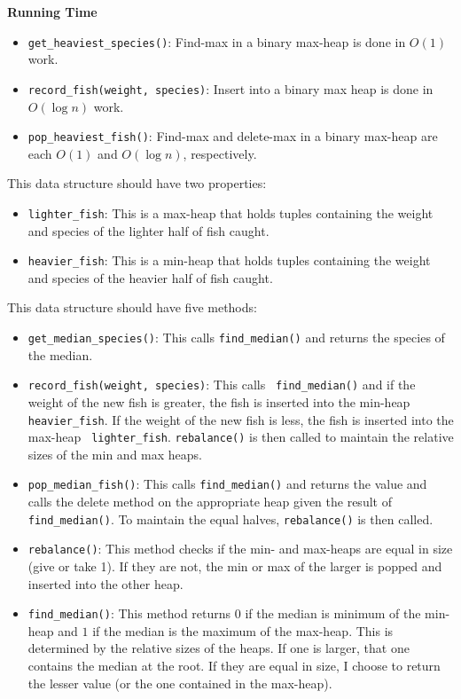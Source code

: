 \documentclass[12pt,twoside]{article}
\begin{document}
\begin{problems}
\begin{problemparts}
    \smallbreak

    {\bf Running Time}
    \begin{itemize}
        \item {\tt get\_heaviest\_species()}: Find-max in a binary max-heap
        is done in $ O(1) $ work.
        \item {\tt record\_fish(weight, species)}: Insert into a binary max
        heap is done in $ O(\log n) $ work.
        \item {\tt pop\_heaviest\_fish()}: Find-max and delete-max in a
        binary max-heap are each $ O(1) $ and $ O(\log n) $, respectively.
    \end{itemize}

 This data structure should have two properties:
    \begin{itemize}
        \item {\tt lighter\_fish}: This is a max-heap that holds tuples
        containing the weight and species of the lighter half of fish caught.
        \item {\tt heavier\_fish}: This is a min-heap that holds tuples
        containing the weight and species of the heavier half of fish caught.
    \end{itemize}
    This data structure should have five methods:
    \begin{itemize}
        \item {\tt get\_median\_species()}: This calls {\tt find\_median()}
        and returns the species of the median.
        \item {\tt record\_fish(weight, species)}: This calls {\tt
        find\_median()} and if the weight of the new fish is greater, the
        fish is inserted into the min-heap {\tt heavier\_fish}. If the weight
        of the new fish is less, the fish is inserted into the max-heap {\tt
        lighter\_fish}. {\tt rebalance()} is then called to maintain the
        relative sizes of the min and max heaps.
        \item {\tt pop\_median\_fish()}: This calls {\tt find\_median()} and
        returns the value and calls the delete method on the appropriate heap
        given the result of {\tt find\_median()}. To maintain the equal
        halves, {\tt rebalance()} is then called.
        \item {\tt rebalance()}: This method checks if the min- and max-heaps
        are equal in size (give or take 1). If they are not, the min or max
        of the larger is popped and inserted into the other heap.
        \item {\tt find\_median()}: This method returns $ 0 $ if the median
        is minimum of the min-heap and $ 1 $ if the median is the maximum of
        the max-heap. This is determined by the relative sizes of the heaps.
        If one is larger, that one contains the median at the root. If they
        are equal in size, I choose to return the lesser value (or the one
        contained in the max-heap).
    \end{itemize}


\end{problemparts}
\end{problems}
\end{document}
